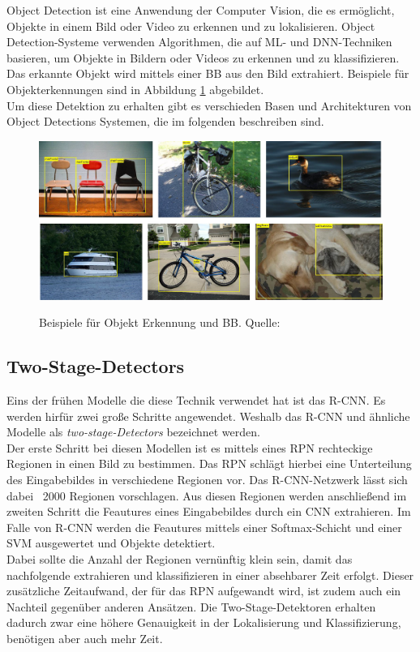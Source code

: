Object Detection ist eine Anwendung der Computer Vision, die es ermöglicht, Objekte in einem Bild oder Video zu erkennen und zu lokalisieren. Object Detection-Systeme verwenden Algorithmen, die auf \ac{ML}- und \ac{DNN}-Techniken basieren, um Objekte in Bildern oder Videos zu erkennen und zu klassifizieren. Das erkannte Objekt wird mittels einer \ac{BB} aus den Bild extrahiert. Beispiele für Objekterkennungen sind in Abbildung \ref{fif:ob_sample} abgebildet.
\\
Um diese Detektion zu erhalten gibt es verschieden Basen und Architekturen von Object Detections Systemen, die im folgenden beschreiben sind. \cite{cv_Szeliski}


\begin{figure}[h]
    \centering
    \includegraphics[width=\textwidth]{images/object_detection_sample.png}
    \label{fif:ob_sample}
    \caption{Beispiele für Objekt Erkennung und \acl{BB}. Quelle: \cite{cv_Szeliski}}
\end{figure}

\subsection{Two-Stage-Detectors}

Eins der frühen Modelle die diese Technik verwendet hat ist das \ac{R-CNN}. Es werden hirfür zwei große Schritte angewendet. Weshalb das \ac{R-CNN} und ähnliche Modelle als \textit{two-stage-Detectors} bezeichnet werden.\\
Der erste Schritt bei diesen Modellen ist es mittels eines \ac{RPN} rechteckige Regionen in einen Bild zu bestimmen.
Das \ac{RPN} schlägt hierbei eine Unterteilung des Eingabebildes in verschiedene Regionen vor. Das \ac{R-CNN}-Netzwerk lässt sich dabei ~2000 Regionen vorschlagen.
Aus diesen Regionen werden anschließend im zweiten Schritt die Feautures eines Eingabebildes durch ein \ac{CNN} extrahieren. Im Falle von \ac{R-CNN} werden die Feautures mittels einer Softmax-Schicht und einer \ac{SVM} ausgewertet und Objekte detektiert.\\
Dabei sollte die Anzahl der Regionen vernünftig klein sein, damit das nachfolgende extrahieren und klassifizieren in einer absehbarer Zeit erfolgt. Dieser zusätzliche Zeitaufwand, der für das \ac{RPN} aufgewandt wird, ist zudem auch ein Nachteil gegenüber anderen Ansätzen. Die Two-Stage-Detektoren erhalten dadurch zwar eine höhere Genauigkeit in der Lokalisierung und Klassifizierung, benötigen aber auch mehr Zeit.\cite{R_CNN}

